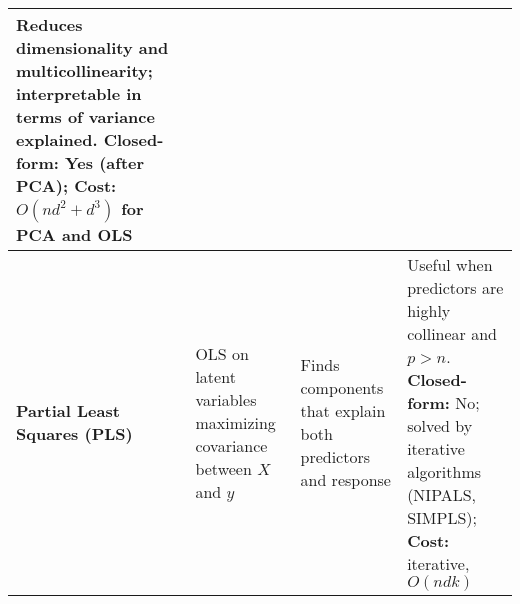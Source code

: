 \documentclass[10pt]{article}
\begin{document}
\begin{longtable}{|>{\bfseries}m{3cm}|m{5cm}|p{3.5cm}|p{6.5cm}|}
{				Reduces dimensionality and multicollinearity; interpretable in terms of variance explained. \\
				\textbf{Closed-form:} Yes (after PCA); \\
				\textbf{Cost:} $O(nd^2 + d^3)$ for PCA and OLS
		} \\
		\hline
		Partial Least Squares (PLS) & \parbox{5cm}{
				OLS on latent variables maximizing covariance between $X$ and $y$
		} & \parbox{3.5cm}{\vspace{2pt}Finds components that explain both predictors and
		response} & \parbox{6.5cm}{\vspace{2pt}
				Useful when predictors are highly collinear and $p > n$. \\
				\textbf{Closed-form:} No; solved by iterative algorithms (NIPALS, SIMPLS); \\
				\textbf{Cost:} iterative, $O(ndk)$
		} \\
		\hline
\end{longtable}
\end{document}
